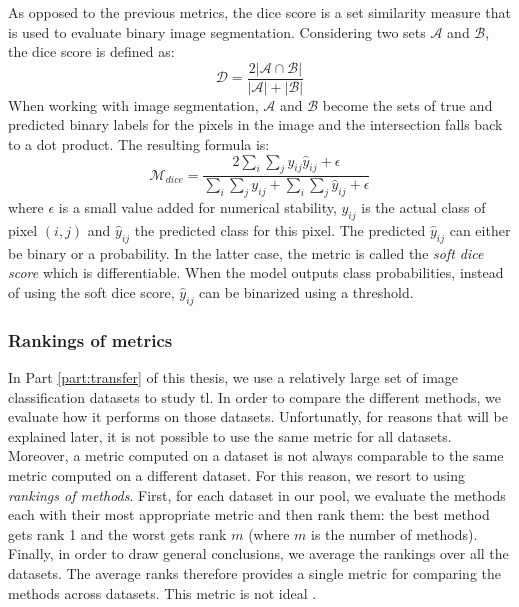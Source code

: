 As opposed to the previous metrics, the dice score is a set similarity measure
that is used to evaluate binary image segmentation. Considering two sets $\mathcal{A}$
and $\mathcal{B}$, the dice score is defined as:
\begin{equation}
\label{eqn:backml:diceAB}
\mathcal{D} = \frac{2 \left|\mathcal{A}\cap \mathcal{B}\right|}{\left|\mathcal{A}\right| + \left|\mathcal{B}\right|}
\end{equation}
When working with image segmentation, $\mathcal{A}$ and $\mathcal{B}$ become the
sets of true and predicted binary labels for the pixels in the image and the
intersection falls back to a dot product. The resulting formula is:
\begin{equation}
\label{eqn:backml:dice}
\mathcal{M}_{dice} = \dfrac{2 \sum_i\sum_j y_{ij} \hat{y}_{ij} + \epsilon}{\sum_i\sum_j y_{ij} + \sum_i\sum_j \hat{y}_{ij} + \epsilon}
\end{equation}
where $\epsilon$ is a small value added for numerical stability, $y_{ij}$ is the
actual class of pixel $(i, j)$ and $\hat{y}_{ij}$ the predicted class for this
pixel. The predicted $\hat{y}_{ij}$ can either be binary or a probability. In the
latter case, the metric is called the \textit{soft dice score} which is differentiable.
When the model outputs class probabilities, instead of using the soft dice score,
$\hat{y}_{ij}$ can be binarized using a threshold.

\subsubsection{Rankings of metrics}
\label{ssec:backml:metric:rankings}

In Part \ref{part:transfer} of this thesis, we use a relatively large set of image
classification datasets to study \acrlong{tl}. In order to compare the different
methods, we evaluate how it performs on those datasets. Unfortunatly, for reasons
that will be explained later, it is not possible to use the same metric for all
datasets. Moreover, a metric computed on a dataset is not always comparable to
the same metric computed on a different dataset. For this reason, we resort to
using \textit{rankings of methods}. First, for each dataset in our pool, we evaluate
the methods each with their most appropriate metric and then rank them: the best
method gets rank 1 and the worst gets rank $m$ (where $m$ is the number of methods).
Finally, in order to draw general conclusions, we average the rankings over all
the datasets. The average ranks therefore provides a single metric for comparing
the methods across datasets. This metric is not ideal
.

